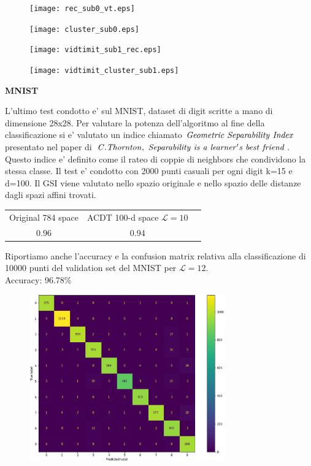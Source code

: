 \documentclass[a4, landscape]{seminar}
\theoremstyle{definition}
\def\bc{\begin{center}}
\def\ec{\end{center}}
\def\bs{\begin{slide}\begingroup\small}
\def\es{\endgroup\end{slide}}
\begin{document}
\bs
\begin{figure}[b]
\centering
\texttt{[image: rec\_sub0\_vt.eps]}
\end{figure}
\es

\bs
\begin{figure}[b]
\centering
\texttt{[image: cluster\_sub0.eps]}
\end{figure}
\es

\bs
\begin{figure}[b]
\centering
\texttt{[image: vidtimit\_sub1\_rec.eps]}
\end{figure}
\es

\bs
\begin{figure}[b]
\centering
\texttt{[image: vidtimit\_cluster\_sub1.eps]}
\end{figure}
\es

\bs
\bc{\bf\color{blue}MNIST}\ec
L'ultimo test condotto e' sul MNIST, dataset di digit scritte a mano di dimensione 28x28.
Per valutare la potenza dell'algoritmo al fine della classificazione si e' valutato un indice chiamato
$\it{Geometric\ Separability\ Index}$ presentato nel paper di $\it{C. Thornton,\ Separability\ is\ a\ learner's\ best\ friend}$.
Questo indice e' definito come il rateo di coppie di neighbors che condividono la stessa classe. Il test e' condotto con 2000 punti casuali per ogni digit k=15 e d=100.
Il GSI viene valutato nello spazio originale e nello spazio delle distanze dagli spazi affini trovati.
\begin{center}
    \begin{tabular}{ |c|c|c| }
    \hline
    Original 784 space & ACDT 100-d space $\mathcal{L} = 10$ \\
    0.96 & \color[HTML]{009901} 0.94 \\
    \hline
    \end{tabular}
\end{center}
\es

\bs
Riportiamo anche l'accuracy e la confusion matrix relativa alla classificazione di 10000 punti del validation set del MNIST per $\mathcal{L}=12$. \\
Accuracy: 96.78\%
\begin{figure}[b]
\centering
\includegraphics[width=0.75\textwidth]{confusionmatrix.eps}
\end{figure}
\es
\end{document}
